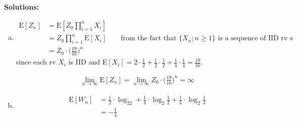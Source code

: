 \documentclass{article}
\begin{document}
    \textbf{Solutions:}
    \begin{enumerate}[(a)]
        \item 
            \begin{equation*}
                \begin{split}
                    \text{E}[Z_n] &= \text{E}[Z_0\prod_{i=1}^nX_i]\\
                    &=Z_0\prod_{i=1}^n\text{E}[X_i]\qquad\text{from the fact that $\{X_n;n\geq 1\}$ is a sequence of IID rv s}\\
                    &=Z_0\cdot\bigg(\frac{19}{16}\bigg)^n
                \end{split}
            \end{equation*}
            since each rv $X_i$ is IID and E$[X_i]=2\cdot\frac{1}{2}+\frac{1}{2}\cdot\frac{1}{2}+\frac{1}{4}\cdot\frac{1}{4}=\frac{19}{16}$.

            \begin{equation*}
                \begin{split}
                    \lim_{n\rightarrow\infty}
                    \text{E}[Z_n]=\lim_{n\rightarrow\infty}Z_0\cdot\bigg(\frac{19}{16}\bigg)^n=\infty
                \end{split}
            \end{equation*}
        \item 
            \begin{equation*}
                \begin{split}
                    \text{E}[W_n] &= \frac{1}{2}\cdot\log_22+\frac{1}{4}\cdot\log_2\frac{1}{2}+\frac{1}{4}\cdot\log_2\frac{1}{4}\\
                    &=-\frac{1}{4}
                \end{split}
            \end{equation*}


\end{enumerate}
\end{document}
